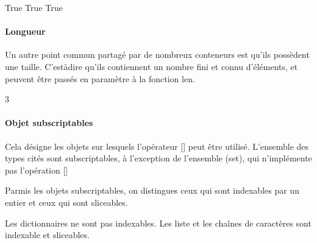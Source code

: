 \documentclass[letterpaper,10pt,english]{sphinxhowto}
\begin{document}
\begin{sphinxVerbatim}[commandchars=\\\{\}]
True
True
True
\end{sphinxVerbatim}


\paragraph{Longueur}
\label{\detokenize{cours3_conteneur_cours:longueur}}
\sphinxAtStartPar
Un autre point commun partagé par de nombreux conteneurs est qu’ils possèdent une taille. C’est\sphinxhyphen{}à\sphinxhyphen{}dire qu’ils contiennent un nombre fini et connu d’éléments, et peuvent être passés en paramètre à la fonction len.

\begin{sphinxVerbatim}[commandchars=\\\{\}]
\end{sphinxVerbatim}

\begin{sphinxVerbatim}[commandchars=\\\{\}]
3
\end{sphinxVerbatim}


\paragraph{Objet subscriptables}
\label{\detokenize{cours3_conteneur_cours:objet-subscriptables}}
\sphinxAtStartPar
Cela désigne les objets sur lesquels l’opérateur {[}{]} peut être utilisé. L’ensemble des types cités sont subscriptables, à l’exception de l’ensemble (set), qui n’implémente pas l’opération {[}{]}

\sphinxAtStartPar
Parmis les objets subscriptables, on distingues ceux qui sont indexables par un entier et ceux qui sont sliceables.

\sphinxAtStartPar
Les dictionnaires ne sont pas indexables. Les liste et les chaînes de caractères sont indexable et sliceables.

\begin{sphinxVerbatim}[commandchars=\\\{\}]
\PYG{p}{[}\PYG{p}{]}

\PYG{p}{[}\PYG{p}{]}
\PYG{p}{[}\PYG{p}{]}
\end{sphinxVerbatim}
\end{document}

